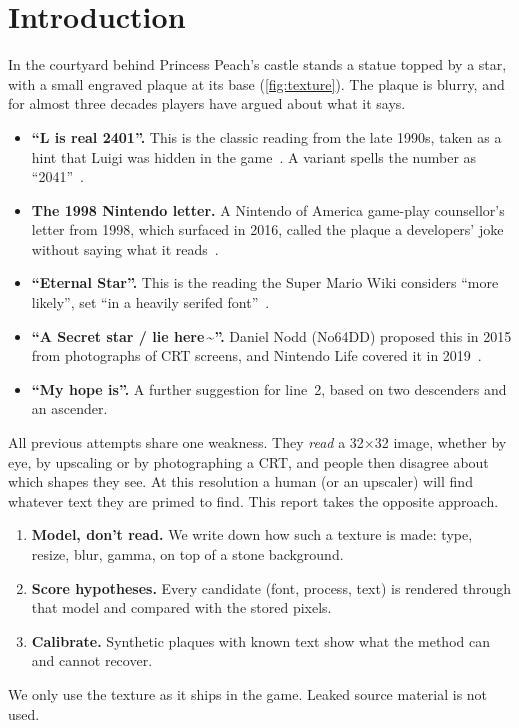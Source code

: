 \documentclass[10pt,a4paper]{article}
\newcommand{\q}[1]{``#1''}
\begin{document}
\section{Introduction}
In the courtyard behind Princess Peach's castle stands a statue topped by a star, with a small engraved plaque at its base
(\cref{fig:texture}). The plaque is blurry, and for almost three decades players have argued about what it says.
\begin{itemize}
\item \textbf{\q{L is real 2401}.} This is the classic reading from the late 1990s, taken as a hint that Luigi was
hidden in the game~\cite{smwcourtyard,mysteries}. A variant spells the number as \q{2041}~\cite{moby}.
\item \textbf{The 1998 Nintendo letter.} A Nintendo of America game-play counsellor's letter from 1998, which surfaced
in 2016, called the plaque a developers' joke without saying what it reads~\cite{mnn,sora}.
\item \textbf{\q{Eternal Star}.} This is the reading the Super Mario Wiki considers \q{more likely}, set \q{in a heavily
serifed font}~\cite{smwcourtyard}.
\item \textbf{\q{A Secret star / lie here\,\textasciitilde}.} Daniel Nodd (No64DD) proposed this in 2015 from
photographs of CRT screens, and Nintendo Life covered it in 2019~\cite{nlife}.
\item \textbf{\q{My hope is}.} A further suggestion for line~2, based on two descenders and an ascender.
\end{itemize}

All previous attempts share one weakness. They \emph{read} a 32$\times$32 image, whether by eye, by upscaling or by
photographing a CRT, and people then disagree about which shapes they see. At this resolution a human (or an
upscaler) will find whatever text they are primed to find. This report takes the opposite approach.
\begin{enumerate}
\item \textbf{Model, don't read.} We write down how such a texture is made: type, resize, blur, gamma, on top of a stone
background.
\item \textbf{Score hypotheses.} Every candidate (font, process, text) is rendered through that model and compared with
the stored pixels.
\item \textbf{Calibrate.} Synthetic plaques with known text show what the method can and cannot recover.
\end{enumerate}
We only use the texture as it ships in the game. Leaked source material is not used.
\end{document}
